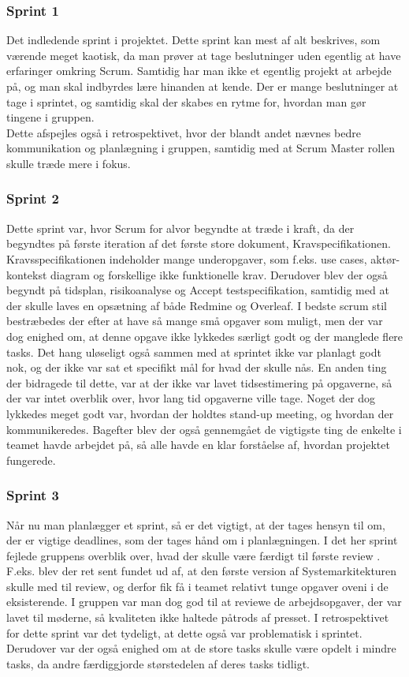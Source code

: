 \documentclass[a4paper,12pt,fleqn,oneside]{article}
\begin{document}
\subsubsection{Sprint 1}
Det indledende sprint i projektet. Dette sprint kan mest af alt beskrives, som værende meget kaotisk, da man prøver at tage beslutninger uden egentlig at have erfaringer omkring Scrum. Samtidig har man ikke et egentlig projekt at arbejde på, og man skal indbyrdes lære hinanden at kende. Der er mange beslutninger at tage i sprintet, og samtidig skal der skabes en rytme for, hvordan man gør tingene i gruppen. 
\\Dette afspejles også i retrospektivet, hvor der blandt andet nævnes bedre kommunikation og planlægning i gruppen, samtidig med at Scrum Master rollen skulle træde mere i fokus. 

\subsubsection{Sprint 2}
Dette sprint var, hvor Scrum for alvor begyndte at træde i kraft, da der begyndtes på første iteration af det første store dokument, Kravspecifikationen. Kravsspecifikationen indeholder mange underopgaver, som f.eks. use cases, aktør-kontekst diagram og forskellige ikke funktionelle krav. Derudover blev der også begyndt på tidsplan, risikoanalyse og Accept testspecifikation, samtidig med at der skulle laves en opsætning af både Redmine og Overleaf. I bedste scrum stil bestræbedes der efter at have så mange små opgaver som muligt, men der var dog enighed om, at denne opgave ikke lykkedes særligt godt og der manglede flere tasks. Det hang uløseligt også sammen med at sprintet ikke var planlagt godt nok, og der ikke var sat et specifikt mål for hvad der skulle nås. En anden ting der bidragede til dette, var at der ikke var lavet tidsestimering på opgaverne, så der var intet overblik over, hvor lang tid opgaverne ville tage. Noget der dog lykkedes meget godt var, hvordan der holdtes stand-up meeting, og hvordan der kommunikeredes. Bagefter blev der også gennemgået de vigtigste ting de enkelte i teamet havde arbejdet på, så alle havde en klar forståelse af, hvordan projektet fungerede. 

\subsubsection{Sprint 3}
Når nu man planlægger et sprint, så er det vigtigt, at der tages hensyn til om, der er vigtige deadlines, som der tages hånd om i planlægningen. I det her sprint fejlede gruppens overblik over, hvad der skulle være færdigt til første review . F.eks. blev der ret sent fundet ud af, at den første version af Systemarkitekturen skulle med til review, og derfor fik få i teamet relativt tunge opgaver oveni i de eksisterende. I gruppen var man dog god til at reviewe de arbejdsopgaver, der var lavet til møderne, så kvaliteten ikke haltede påtrods af presset. I retrospektivet for dette sprint var det tydeligt, at dette også var problematisk i sprintet. Derudover var der også enighed om at de store tasks skulle være opdelt i mindre tasks, da andre færdiggjorde størstedelen af deres tasks tidligt. 
\end{document}
